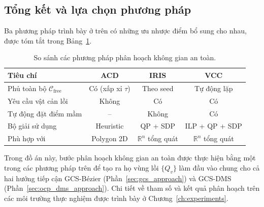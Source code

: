 \subsection*{Tổng kết và lựa chọn phương pháp}

Ba phương pháp trình bày ở trên có những ưu nhược điểm bổ sung cho nhau, được tóm tắt trong Bảng~\ref{tab:decomp_comparison}.

\begin{table}[htbp]
\centering
\caption{So sánh các phương pháp phân hoạch không gian an toàn.}
\label{tab:decomp_comparison}
\begin{tabular}{lccc}
\hline
\textbf{Tiêu chí} & \textbf{ACD} & \textbf{IRIS} & \textbf{VCC} \\
\hline
Phủ toàn bộ $\mathcal{C}_{\mathrm{free}}$ & Có (xấp xỉ $\tau$) & Theo seed & Tự động lặp \\
Yêu cầu vật cản lồi & Không & Có & Có \\
Tự động đặt điểm mầm & -- & Không & Có \\
Bộ giải sử dụng & Heuristic & QP + SDP & ILP + QP + SDP \\
Phù hợp với & Polygon 2D & $\mathbb{R}^n$ tổng quát & $\mathbb{R}^n$ tổng quát \\
\hline
\end{tabular}
\end{table}

Trong đồ án này, bước phân hoạch không gian an toàn được thực hiện bằng một trong các phương pháp trên để tạo ra họ vùng lồi $\{Q_v\}$ làm đầu vào chung cho cả hai hướng tiếp cận GCS-Bézier (Phần~\ref{sec:gcs_approach}) và GCS-DMS (Phần~\ref{sec:ocp_dms_approach}). Chi tiết về tham số và kết quả phân hoạch trên các môi trường thực nghiệm được trình bày ở Chương~\ref{ch:experiments}.
